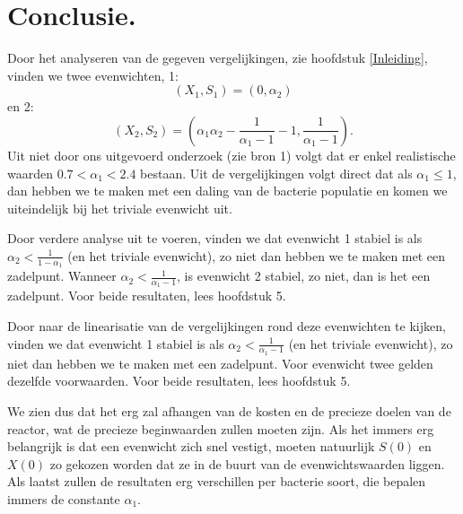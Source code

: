 
\chapter{Conclusie.}
Door het analyseren van de gegeven vergelijkingen, zie hoofdstuk \ref{Inleiding}, vinden we twee evenwichten, 1:
\[ 
	 (X_1, S_1) = (0, \alpha_2)
\]
en 2:
\[
	(X_2, S_2) =\left( \alpha_1\alpha_2 - \frac{1}{\alpha_1 - 1} - 1, \frac{1}{\alpha_1 - 1}\right).
\] 
Uit niet door ons uitgevoerd onderzoek (zie bron 1) volgt dat er enkel realistische waarden $0.7 < \alpha_1 < 2.4$ bestaan. Uit de vergelijkingen volgt direct dat als $\alpha_1 \leq 1$, dan hebben we te maken met een daling van de bacterie populatie en komen we uiteindelijk bij het triviale evenwicht uit. 

Door verdere analyse uit te voeren, vinden we dat evenwicht 1 stabiel is als $\alpha_2 < \frac{1}{1 - \alpha_1}$ (en het triviale evenwicht), zo niet dan hebben we te maken met een zadelpunt. Wanneer $\alpha_2 < \frac{1}{\alpha_1 - 1}$, is evenwicht 2 stabiel, zo niet, dan is het een zadelpunt. Voor beide resultaten, lees hoofdstuk 5. 

Door naar de linearisatie van de vergelijkingen rond deze evenwichten te kijken, vinden we dat evenwicht 1 stabiel is als $\alpha_2 < \frac{1}{\alpha_1 - 1}$ (en het triviale evenwicht), zo niet dan hebben we te maken met een zadelpunt. Voor evenwicht twee gelden dezelfde voorwaarden. Voor beide resultaten, lees hoofdstuk 5. 

We zien dus dat het erg zal afhangen van de kosten en de precieze doelen van de reactor, wat de precieze beginwaarden zullen moeten zijn. Als het immers erg belangrijk is dat een evenwicht zich snel vestigt, moeten natuurlijk $S(0)$ en $X(0)$ zo gekozen worden dat ze in de buurt van de evenwichtswaarden liggen. Als laatst zullen de resultaten erg verschillen per bacterie soort, die bepalen immers de constante $\alpha_1$. 

